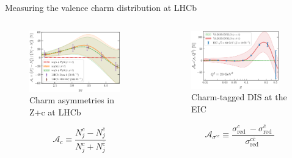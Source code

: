 \documentclass[aspectratio=43, 8pt,t]{beamer}
\begin{document}
\begin{frame}{Measuring the valence charm distribution at LHCb}
  \begin{columns}
    \begin{column}{0.49\columnwidth}
      \begin{figure}
        \includegraphics[width=0.9\textwidth]{lhcb-zcharm-pheno-asymm.pdf}
        \caption*{Charm asymmetries in Z+c at LHCb}
      \end{figure}
      \begin{equation*}
        \mathcal{A}_c \equiv \frac{N_j^c-N_j^{\bar{c}}}{N_j^c+N_j^{\bar{c}}}
        \end{equation*}
    \end{column}
    \begin{column}{0.49\columnwidth}
      \begin{figure}
        \includegraphics[width=0.9\textwidth]{ICasym-main-Fig4-EIC.pdf}
        \caption*{Charm-tagged DIS at the EIC}
      \end{figure}
      \begin{equation*}
        \mathcal{A}_{\sigma^{c c}} \equiv \frac{\sigma_{\text {red }}^c-\sigma_{\text {red }}^{\bar{c}}}{\sigma_{\text {red }}^{c \bar{c}}}
        \end{equation*}
    \end{column}
  \end{columns}

\end{frame}
\end{document}
